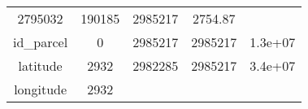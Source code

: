 \documentclass[]{book}
\theoremstyle{definition}
\theoremstyle{definition}
\theoremstyle{definition}
\theoremstyle{remark}
\begin{document}
\begin{longtable}[]{@{}ccccc@{}}
\begin{minipage}[t]{0.12\columnwidth}
2795032\strut
\end{minipage} & \begin{minipage}[t]{0.13\columnwidth}\centering\strut
190185\strut
\end{minipage} & \begin{minipage}[t]{0.12\columnwidth}\centering\strut
2985217\strut
\end{minipage} & \begin{minipage}[t]{0.12\columnwidth}\centering\strut
2754.87\strut
\end{minipage}\tabularnewline
\begin{minipage}[t]{0.35\columnwidth}\centering\strut
id\_parcel\strut
\end{minipage} & \begin{minipage}[t]{0.12\columnwidth}\centering\strut
0\strut
\end{minipage} & \begin{minipage}[t]{0.13\columnwidth}\centering\strut
2985217\strut
\end{minipage} & \begin{minipage}[t]{0.12\columnwidth}\centering\strut
2985217\strut
\end{minipage} & \begin{minipage}[t]{0.12\columnwidth}\centering\strut
1.3e+07\strut
\end{minipage}\tabularnewline
\begin{minipage}[t]{0.35\columnwidth}\centering\strut
latitude\strut
\end{minipage} & \begin{minipage}[t]{0.12\columnwidth}\centering\strut
2932\strut
\end{minipage} & \begin{minipage}[t]{0.13\columnwidth}\centering\strut
2982285\strut
\end{minipage} & \begin{minipage}[t]{0.12\columnwidth}\centering\strut
2985217\strut
\end{minipage} & \begin{minipage}[t]{0.12\columnwidth}\centering\strut
3.4e+07\strut
\end{minipage}\tabularnewline
\begin{minipage}[t]{0.35\columnwidth}\centering\strut
longitude\strut
\end{minipage} & \begin{minipage}[t]{0.12\columnwidth}\centering\strut
2932\strut
\end{minipage} & \begin{minipage}[t]{0.13\columnwidth}\centering\strut

\end{minipage}
\end{longtable}
\end{document}
